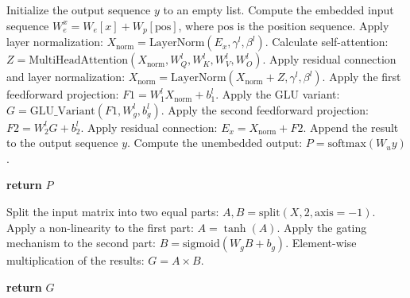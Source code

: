 \documentclass{article}
\begin{document}
\begin{algorithm}
\begin{algorithmic}[1]
\State Initialize the output sequence $y$ to an empty list.
\State Compute the embedded input sequence $W_e^x = W_e[x] + W_p[\text{pos}]$, where $\text{pos}$ is the position sequence.
    \State Apply layer normalization: $X_{\text{norm}} = \text{LayerNorm}(E_x, \gamma^l, \beta^l)$.
    \State Calculate self-attention: $Z = \text{MultiHeadAttention}(X_{\text{norm}}, W_Q^l, W_K^l, W_V^l, W_O^l)$.
    \State Apply residual connection and layer normalization: $X_{\text{norm}} = \text{LayerNorm}(X_{\text{norm}} + Z, \gamma^l, \beta^l)$.
    \State Apply the first feedforward projection: $F1 = W_1^lX_{\text{norm}} + b_1^l$.
    \State Apply the GLU variant: $G = \text{GLU\_Variant}(F1, W_g^l, b_g^l)$.
    \State Apply the second feedforward projection: $F2 = W_2^lG + b_2^l$.
    \State Apply residual connection: $E_x = X_{\text{norm}} + F2$.
    \State Append the result to the output sequence $y$.
\EndFor
\State Compute the unembedded output: $P = \text{softmax}(W_uy)$.

\State \textbf{return} $P$

    \State Split the input matrix into two equal parts: $A, B = \text{split}(X, 2, \text{axis}=-1)$.
    \State Apply a non-linearity to the first part: $A = \tanh(A)$.
    \State Apply the gating mechanism to the second part: $B = \text{sigmoid}(W_gB + b_g)$.
    \State Element-wise multiplication of the results: $G = A \times B$.

    \State \textbf{return} $G$
\EndFunction

\end{algorithmic}
\end{algorithm}
\end{document}
